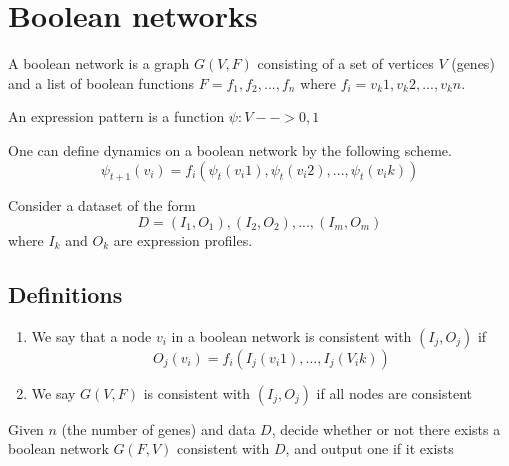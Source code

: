 \documentclass[10pt]{article}
\newenvironment{menumerate}
{
  \begin{enumerate}
  \setlength{\itemsep}{1pt}
  \setlength{\parskip}{0pt}
  \setlength{\parsep}{0pt}}{\end{enumerate}
}
\begin{document}
\section*{Boolean networks}

A boolean network is a graph $G(V, F)$ consisting of a set of vertices $V$ (genes) and a list of boolean functions $F = {f_1, f_2, ..., f_n}$ where $f_i = {v_k1, v_k2, ..., v_kn}$.

An expression pattern is a function $\psi : V --> {0,1}$

One can define dynamics on a boolean network by the following scheme. \[ \psi_{t+1}(v_i) = f_i(\psi_t(v_i1), \psi_t(v_i2), ..., \psi_t(v_ik)) \]

Consider a dataset of the form \[ D = {(I_1, O_1), (I_2, O_2), ..., (I_m, O_m)} \] where $I_k$ and $O_k$ are expression profiles.

\subsection*{Definitions}
\begin{menumerate}
  \item We say that a node $v_i$ in a boolean network is consistent with $(I_j, O_j)$ if \[ O_j(v_i) = f_i(I_j(v_i1), ..., I_j(V_ik)) \]
  \item We say $G(V, F)$ is consistent with $(I_j, O_j)$ if all nodes are consistent
\end{menumerate}

Given $n$ (the number of genes) and data $D$, decide whether or not there exists a boolean network $G(F,V)$ consistent with $D$, and output one if it exists
\end{document}
